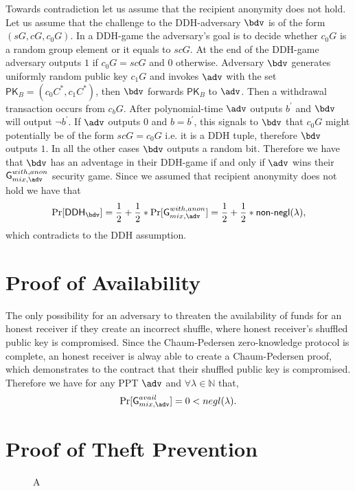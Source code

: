 \documentclass[a4paper]{article}
\theoremstyle{definition}
\begin{document}
\begin{appendices}
Towards contradiction let us assume that the recipient anonymity does not hold. Let us assume that the challenge to the DDH-adversary $\bdv$ is of the form $(sG,cG,c_{0}G)$. In a DDH-game the adversary's goal is to decide whether $c_{0}G$ is a random group element or it equals to $scG$. At the end of the DDH-game adversary outputs $1$ if $c_{0}G=scG$ and $0$ otherwise.  Adversary $\bdv$ generates uniformly random public key $c_{1}G$ and invokes $\adv$ with the set $\textsf{PK}_{B}=(c_{0}C^{*}, c_{1}C^{*})$, then $\bdv$ forwards $\textsf{PK}_{B}$ to $\adv$. Then a withdrawal transaction occurs from $c_{b}G$. After polynomial-time $\adv$ outputs $b^{'}$ and $\bdv$ will output $\lnot b^{'}$. If $\adv$ outputs $0$ and $b=b^{'}$, this signals to $\bdv$ that $c_{0}G$ might potentially be of the form $scG=c_{0}G$  i.e. it is a DDH tuple, therefore $\bdv$ outputs $1$. In all the other cases $\bdv$ outputs a random bit. Therefore we have that $\bdv$ has an adventage in their DDH-game if and only if $\adv$ wins their $\textsf{G}^{with, anon}_{mix, \adv}$ security game. Since we assumed that recipient anonymity does not hold we have that $$\Pr[\textsf{DDH}_{\bdv}]=\frac{1}{2}+\frac{1}{2}*\Pr[\textsf{G}^{with, anon}_{mix, \adv}]=\frac{1}{2}+\frac{1}{2}*\textsf{non-negl}(\lambda),$$ which contradicts to the DDH assumption.

\section{Proof of Availability}  \label{appendavail}

The only possibility for an adversary to threaten the availability of funds for an honest receiver if they create an incorrect shuffle, where honest receiver's shuffled public key is compromised. Since the Chaum-Pedersen zero-knowledge protocol is complete, an honest receiver is alway able to create a Chaum-Pedersen proof, which demonstrates to the contract that their shuffled public key is compromised. Therefore we have for any PPT $\adv$ and $\forall \lambda \in \mathbb{N}$ that, $$\Pr[\textsf{G}^{avail}_{mix, \adv}]=0<negl(\lambda).$$

\section{Proof of Theft Prevention} \label{appendtheft}

\begin{wrapfigure}{r}{0.5\textwidth}
	\centering
	\begin{bbrenv}{A}
		\begin{bbrbox} [name=\bdv]
			

\end{bbrbox}
\end{bbrenv}
\end{wrapfigure}
\end{appendices}
\end{document}
